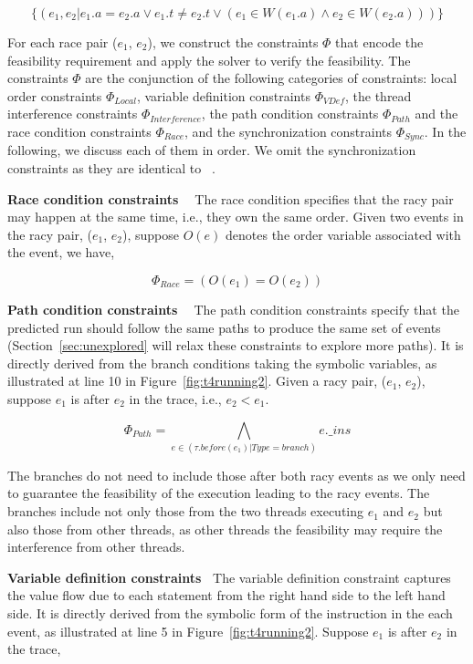 $$
\{(e_1, e_2| e_1.a=e_2.a \vee e_1.t\neq e_2.t \vee (e_1\in W(e_1.a) \wedge e_2\in W(e_2.a) ))\}
$$


For each race pair ($e_1$, $e_2$), we construct the constraints $\Phi$ that encode the feasibility requirement and apply the solver to verify the feasibility. The constraints $\Phi$ are the conjunction of the following categories of constraints: local order constraints $\Phi_{Local}$, variable definition constraints $\Phi_{VDef}$, the thread interference constraints $\Phi_{Interference}$, the path condition constraints $\Phi_{Path}$ and the race condition constraints $\Phi_{Race}$, and the synchronization constraints $\Phi_{Sync}$. In the following, we discuss each of them in  order.
We omit the synchronization constraints as they are identical to ~\cite{jeff}.


{\bf Race condition constraints \ } The race condition specifies that the racy pair may happen at the same time, i.e., they own the same order. 
Given two events in the racy pair, ($e_1$, $e_2$), suppose $O(e)$ denotes the order variable associated with the event, we have,

$$
\Phi_{Race}= (O(e_1)=O(e_2))
$$




{\bf Path condition constraints \ } The path condition constraints specify that the predicted run should follow the same paths to produce the same set of events (Section~\ref{sec:unexplored} will relax these constraints to explore more paths).  It is directly derived from the branch conditions taking the symbolic variables, as illustrated at line 10 in Figure~\ref{fig:t4running2}.
Given a racy pair, ($e_1$, $e_2$), suppose $e_1$ is after $e_2$ in the trace, i.e., $e_2< e_1$. 

$$
\Phi_{Path}=\bigwedge_{e\in (\tau.before(e_1)|Type=branch)} e.\_ins 
$$

The branches do not need to include those after both racy events as we only need to guarantee the feasibility of the  execution leading to the racy events.
The branches include not only those from the two threads executing $e_1$ and $e_2$ but also those from other threads, as other threads the feasibility may require the interference from other threads.
 




{\bf Variable definition constraints\ } The variable definition constraint captures the value flow due to each statement from the right hand side to the left hand side. It is directly derived from the symbolic form of the instruction in the each event, as illustrated at line 5 in Figure~\ref{fig:t4running2}.
Suppose $e_1$ is after $e_2$ in the trace,

